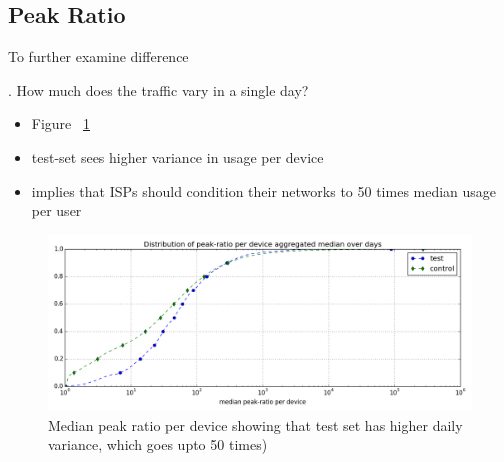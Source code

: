 \subsection{Peak Ratio}
\label{subsec:peakratio}

To further examine difference


. How much does the traffic vary in a single day?

\begin{itemize}
\itemsep0em 
\item Figure ~\ref{fig:CDF-peak-ratio-median}
\item test-set sees higher variance in usage per device
\item implies that ISPs should condition their networks to 50 times median usage per user
\end{itemize}



\begin{figure}[ht!]
\begin{minipage}{0.90\linewidth}
\centering
\includegraphics[width=1\linewidth]{figures/peakratio-CDF-devices-MEDIAN.png}
\caption{Median peak ratio per device showing that test set has higher daily variance, which goes upto 50 times)}
\label{fig:CDF-peak-ratio-median}
\end{minipage}
\end{figure}








%
%


